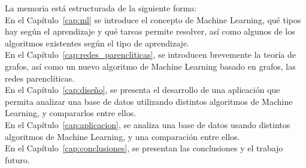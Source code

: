 La memoria está estructurada de la siguiente forma:\\

En el Capítulo~\ref{cap:ml} se introduce el concepto de Machine Learning, qué tipos hay según el aprendizaje y qué tareas permite resolver, así como algunos de los algoritmos existentes según el tipo de aprendizaje.\\

En el Capítulo~\ref{cap:redes_parencliticas}, se introducen brevemente la teoría de grafos, así como un nuevo algoritmo de Machine Learning basado en grafos, las redes parenclíticas.\\

En el Capítulo~\ref{cap:diseño}, se presenta el desarrollo de una aplicación que permita analizar una base de datos utilizando distintos algoritmos de Machine Learning, y compararlos entre ellos.\\

En el Capítulo~\ref{cap:aplicacion}, se analiza una base de datos usando distintos algoritmos de Machine Learning, y una comparación entre ellos.\\

En el Capítulo~\ref{cap:conclusiones}, se presentan las conclusiones y el trabajo futuro. 





